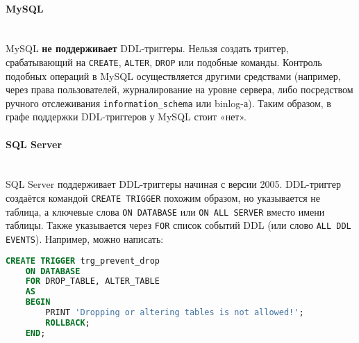 \paragraph{\textbf{MySQL}} ~\\
 MySQL \textbf{не поддерживает} DDL-триггеры. Нельзя создать триггер, срабатывающий на \texttt{CREATE}, \texttt{ALTER}, \texttt{DROP} или подобные команды. Контроль подобных операций в MySQL осуществляется другими средствами (например, через права пользователей, журналирование на уровне сервера, либо посредством ручного отслеживания \texttt{information\_schema} или binlog-а). Таким образом, в графе поддержки DDL-триггеров у MySQL стоит «нет».

\paragraph{\textbf{SQL Server}} ~\\
 SQL Server поддерживает DDL-триггеры начиная с версии 2005. DDL-триггер создаётся командой \texttt{CREATE TRIGGER} похожим образом, но указывается не таблица, а ключевые слова \texttt{ON DATABASE} или \texttt{ON ALL SERVER} вместо имени таблицы. Также указывается через \texttt{FOR} список событий DDL (или слово \texttt{ALL DDL EVENTS}). Например, можно написать:

 \begin{lstlisting}[language=SQL]
    CREATE TRIGGER trg_prevent_drop
    ON DATABASE
    FOR DROP_TABLE, ALTER_TABLE
    AS
    BEGIN
        PRINT 'Dropping or altering tables is not allowed!';
        ROLLBACK;
    END;
 \end{lstlisting}

